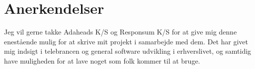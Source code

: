 \chapter{Anerkendelser}

Jeg vil gerne takke Adaheads K/S og Responsum K/S for at give mig denne enestående mulig for at skrive mit projekt i samarbejde med dem. Det har givet mig indsigt i telebrancen og general software udvikling i erhverslivet, og samtidig have muligheden for at lave noget som folk kommer til at bruge.

